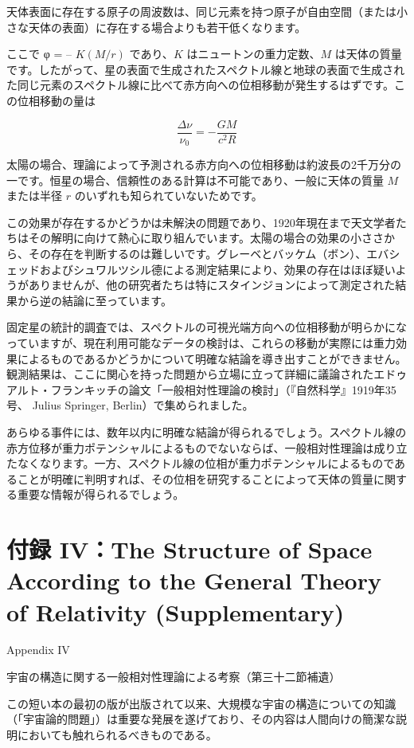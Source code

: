 \documentclass[a4paper,11pt,openany]{ltjsbook}
\begin{document}
天体表面に存在する原子の周波数は、同じ元素を持つ原子が自由空間（または小さな天体の表面）に存在する場合よりも若干低くなります。

ここで φ = – $K (M/r)$ であり、$K$ はニュートンの重力定数、$M$ は天体の質量です。したがって、星の表面で生成されたスペクトル線と地球の表面で生成された同じ元素のスペクトル線に比べて赤方向への位相移動が発生するはずです。この位相移動の量は



\[ \frac{\Delta \nu}{\nu_0} = -\frac{G M}{c^2 R} \]



太陽の場合、理論によって予測される赤方向への位相移動は約波長の2千万分の一です。恒星の場合、信頼性のある計算は不可能であり、一般に天体の質量 $M$ または半径 $r$ のいずれも知られていないためです。

この効果が存在するかどうかは未解決の問題であり、1920年現在まで天文学者たちはその解明に向けて熱心に取り組んでいます。太陽の場合の効果の小ささから、その存在を判断するのは難しいです。グレーベとバッケム（ボン）、エバシェッドおよびシュワルツシル德による測定結果により、効果の存在はほぼ疑いようがありませんが、他の研究者たちは特にスタインジョンによって測定された結果から逆の結論に至っています。

固定星の統計的調査では、スペクトルの可視光端方向への位相移動が明らかになっていますが、現在利用可能なデータの検討は、これらの移動が実際には重力効果によるものであるかどうかについて明確な結論を導き出すことができません。観測結果は、ここに関心を持った問題から立場に立って詳細に議論されたエドゥアルト・フランキッチの論文「一般相対性理論の検討」（『自然科学』1919年35号、 Julius Springer, Berlin）で集められました。

あらゆる事件には、数年以内に明確な結論が得られるでしょう。スペクトル線の赤方位移が重力ポテンシャルによるものでないならば、一般相対性理論は成り立たなくなります。一方、スペクトル線の位相が重力ポテンシャルによるものであることが明確に判明すれば、その位相を研究することによって天体の質量に関する重要な情報が得られるでしょう。


\clearpage
\chapter{付録 IV：The Structure of Space According to the General Theory of Relativity (Supplementary)}

Appendix IV

宇宙の構造に関する一般相対性理論による考察（第三十二節補遺）

この短い本の最初の版が出版されて以来、大規模な宇宙の構造についての知識（「宇宙論的問題」）は重要な発展を遂げており、その内容は人間向けの簡潔な説明においても触れられるべきものである。
\end{document}
